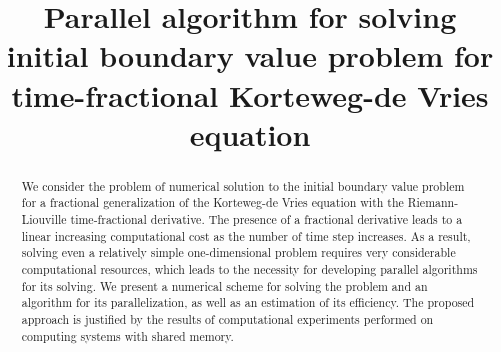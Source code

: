 \documentclass[11pt, oneside, a4paper]{article}
\begin{document}

\title{Parallel algorithm for solving initial boundary value problem for time-fractional Korteweg-de Vries equation}


\begin{abstract}
We consider the problem of numerical solution to the initial boundary value problem for a fractional generalization of the Korteweg-de Vries equation with the Riemann-Liouville time-fractional derivative. The presence of a fractional derivative leads to a linear increasing computational cost as the number of time step increases. As a result, solving even a relatively simple one-dimensional problem requires very considerable computational resources, which leads to the necessity for developing parallel algorithms for its solving. We present a numerical scheme for solving the problem and an algorithm for its parallelization, as well as an estimation of its efficiency. The proposed approach is justified by the results of computational experiments performed on computing systems with shared memory.
\end{abstract}


\end{document}
